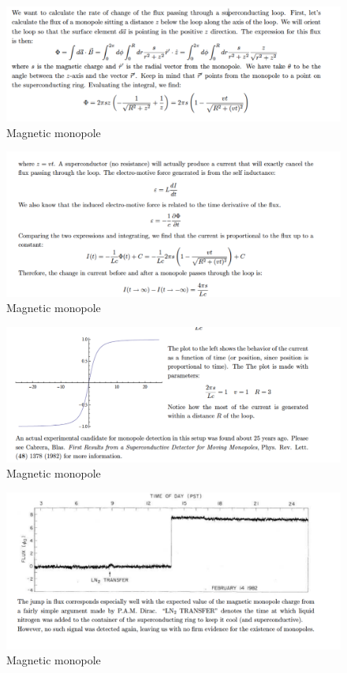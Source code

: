 \documentclass[makesolutionspdf]{esg8022pset}
\begin{document}
\begin{solution}

 \begin{figure}[H]
    \centering
    \includegraphics[width = 15cm]{mono_sol_a}
    \caption{Magnetic monopole}
\end{figure}

 \begin{figure}[H]
    \centering
    \includegraphics[width = 15cm]{mono_sol_b}
    \caption{Magnetic monopole}
\end{figure}

 \begin{figure}[H]
    \centering
    \includegraphics[width = 15cm]{monopole_sol_c}
    \caption{Magnetic monopole}
   \end{figure} 
    
     \begin{figure}[H]
    \centering
    \includegraphics[width = 15cm]{monopole_sol_d}
    \caption{Magnetic monopole}
\end{figure}


\end{solution}
\end{document}
